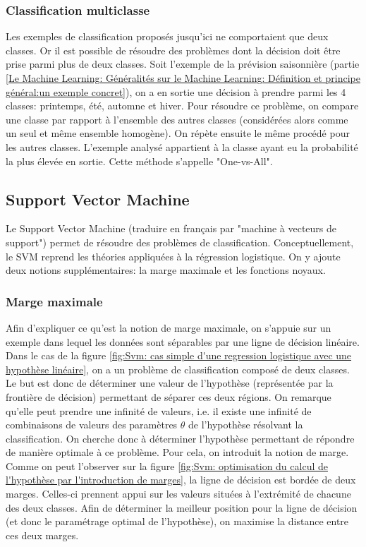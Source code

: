 \subsubsection{Classification multiclasse}
\label{Le Machine Learning: Les différents algorithmes: La regression logistique: La classification multi-classe}
Les exemples de classification proposés jusqu'ici ne comportaient que deux classes. Or il est possible de résoudre des problèmes dont la décision doit être prise parmi plus de deux classes. Soit l'exemple de la prévision saisonnière (partie \ref{Le Machine Learning: Généralités sur le Machine Learning: Définition et principe général:un exemple concret}), on a en sortie une décision à prendre parmi les 4 classes: printemps, été, automne et hiver. Pour résoudre ce problème, on compare une classe par rapport à l'ensemble des autres classes (considérées alors comme un seul et même ensemble homogène). On répète ensuite le même procédé pour les autres classes. L'exemple analysé appartient à la classe ayant eu la probabilité la plus élevée en sortie. Cette méthode s'appelle "One-vs-All".


\subsection{Support Vector Machine}
\label{Le Machine Learning: Les différents algorithmes: SVM}
Le Support Vector Machine (traduire en français par "machine à vecteurs de support") permet de résoudre des problèmes de classification. Conceptuellement, le SVM reprend les théories appliquées à la régression logistique. On y ajoute deux notions supplémentaires: la marge maximale et les fonctions noyaux.

\subsubsection{Marge maximale}
\label{Le Machine Learning: Les différents algorithmes: SVM: la marge maximale}
Afin d'expliquer ce qu'est la notion de marge maximale, on s'appuie sur un exemple dans lequel les données sont séparables par une ligne de décision linéaire. Dans le cas de la figure \ref{fig:Svm: cas simple d'une regression logistique avec une hypothèse linéaire}, on a un problème de classification composé de deux classes. Le but est donc de déterminer une valeur de l'hypothèse (représentée par la frontière de décision) permettant de séparer ces deux régions. On remarque qu'elle peut prendre une infinité de valeurs, i.e. il existe une infinité de combinaisons de valeurs des paramètres $\theta$ de l'hypothèse résolvant la classification. On cherche donc à déterminer l'hypothèse permettant de répondre de manière optimale à ce problème. Pour cela, on introduit la notion de marge. Comme on peut l'observer sur la figure \ref{fig:Svm: optimisation du calcul de l'hypothèse par l'introduction de marges}, la ligne de décision est bordée de deux marges. Celles-ci prennent appui sur les valeurs situées à l'extrémité de chacune des deux classes. Afin de déterminer la meilleur position pour la ligne de décision (et donc le paramétrage optimal de l'hypothèse), on maximise la distance entre ces deux marges. 

